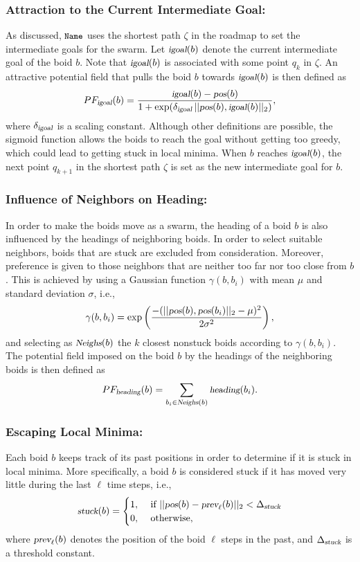 \documentclass{llncs}
\newcommand{\Acronym}[1]{\ensuremath{{\small{\texttt{#1}}}}}
\newcommand{\Var}[1]{\ensuremath{{\small{\textsl{#1}}}}}
\newcommand{\Name}{\Acronym{Name}}
\begin{document}
\subsubsection{Attraction to the Current Intermediate Goal:}
\label{sec:PFigoal} As
discussed, $\Name$ uses the shortest path $\zeta$ in the roadmap to
set the intermediate goals for the swarm. Let $\Var{igoal}(b)$ denote
the current intermediate goal of the boid $b$. Note that
$\Var{igoal}(b)$ is associated with some point $q_k$ in $\zeta$. An
attractive potential field that
pulls the boid $b$ towards $\Var{igoal}(b)$ is then defined as 
$$
PF_\Var{igoal}(b) = \frac{\Var{igoal}(b) - \Var{pos}(b)}{1 +
  \exp(\delta_\Var{igoal}\, ||\Var{pos}(b), \Var{igoal}(b)||_2)},
$$ where $\delta_\Var{igoal}$ is a scaling constant. Although other
definitions are possible, the sigmoid function allows the boids to
reach the goal without getting too greedy, which could lead to getting
stuck in local minima. When $b$ reaches $\Var{igoal}(b)$, the next
point $q_{k+1}$ in the shortest path $\zeta$ is set as the new
intermediate goal for $b$.

\subsubsection{Influence of Neighbors on Heading:}
\label{sec:PFheading}
 In order to make
the boids move as a swarm, the heading of a boid $b$ is also
influenced by the headings of neighboring boids. In order to select
suitable neighbors, boids that are stuck
are excluded from consideration. Moreover, preference is given to those
neighbors that are neither too far nor too close from $b$. This is
achieved by using a Gaussian function $\gamma(b, b_i)$ with mean $\mu$ and standard
deviation $\sigma$, i.e.,
$$
\gamma(b, b_i) = \exp\left(\frac{-(||\Var{pos}(b), \Var{pos}(b_i)||_2 - \mu)^2}
{2\sigma^2}\right),
$$
and selecting as $\Var{Neighs}(b)$ the $k$ closest nonstuck boids
according to $\gamma(b, b_i)$.
The potential
field imposed on the boid $b$ by the headings of the neighboring boids
is then defined as
$$
PF_\Var{heading}(b) = \sum_{b_i \in
    \Var{Neighs}(b)} \Var{heading}(b_i).
$$




\subsubsection{Escaping Local Minima:}
\label{sec:PFrand}
Each boid $b$ keeps track of its past positions in order to determine
if it is stuck in local minima. More specifically, a boid $b$ is
considered stuck if it has moved very little during the last $\ell$
time steps, i.e.,
$$
\Var{stuck}(b) = 
\begin{cases}
1, & \mbox{ if } ||\Var{pos}(b) - \Var{prev}_{\ell}(b)||_2 <
\Delta_\Var{stuck}\\
0, & \mbox{ otherwise,}
\end{cases}
$$
 where $\Var{prev}_{\ell}(b)$ denotes the position of the boid 
 $\ell$ steps in the past,  and $\Delta_\Var{stuck}$ is a
 threshold constant.
\end{document}
